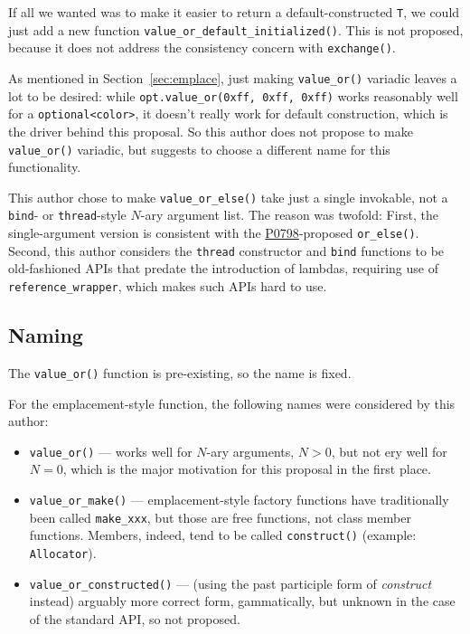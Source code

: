 \documentclass[11pt]{article}
\newcommand{\wgpaper}[1]{\href{https://wg21.link/#1}{#1}}
\begin{document}
If all we wanted was to make it easier to return a default-constructed
\texttt{T}, we could just add a new function
\texttt{value\_or\_default\_initialized()}. This is not proposed,
because it does not address the consistency concern with
\texttt{exchange()}.

As mentioned in Section~\ref{sec:emplace}, just making
\texttt{value\_or()} variadic leaves a lot to be desired: while
\texttt{opt.value\_or(0xff, 0xff, 0xff)} works reasonably well for a
\texttt{optional<color>}, it doesn't really work for default
construction, which is the driver behind this proposal. So this author
does not propose to make \texttt{value\_or()} variadic, but suggests
to choose a different name for this functionality.

This author chose to make \texttt{value\_or\_else()} take just a
single invokable, not a \texttt{bind}- or \texttt{thread}-style
$N$-ary argument list. The reason was twofold: First, the
single-argument version is consistent with the
\wgpaper{P0798}-proposed \texttt{or\_else()}. Second, this author
considers the \texttt{thread} constructor and \texttt{bind} functions
to be old-fashioned APIs that predate the introduction of lambdas,
requiring use of \texttt{reference\_wrapper}, which makes such APIs
hard to use.

\subsection{Naming}
\label{sec:naming}

The \texttt{value\_or()} function is pre-existing, so the name is fixed.

For the emplacement-style function, the following names were
considered by this author:

\begin{itemize}
\item \texttt{value\_or()} — works well for $N$-ary arguments, $N>0$,
  but not ery well for $N=0$, which is the major motivation for this
  proposal in the first place.
\item \texttt{value\_or\_make()} — emplacement-style factory functions
  have traditionally been called \texttt{make\_xxx}, but those are
  free functions, not class member functions. Members, indeed, tend to
  be called \texttt{construct()} (example: \texttt{Allocator}).
\item \texttt{value\_or\_constructed()} — (using the past participle
  form of \emph{construct} instead) arguably more correct form,
  gammatically, but unknown in the case of the standard API, so not
  proposed.
\end{itemize}
\end{document}

